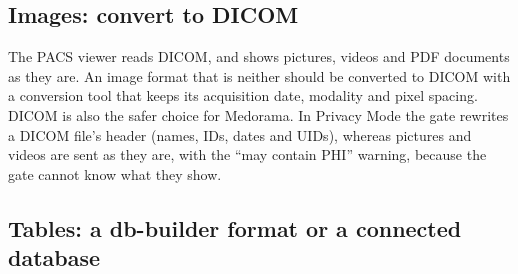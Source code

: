 \subsection{Images: convert to DICOM}
\label{sec:readers-images}

The PACS viewer reads DICOM, and shows pictures, videos and PDF documents as they are. An image
format that is neither should be converted to DICOM with a conversion tool that keeps its
acquisition date, modality and pixel spacing. DICOM is also the safer choice for Medorama. In
Privacy Mode the gate rewrites a DICOM file's header (names, IDs, dates and UIDs), whereas
pictures and videos are sent as they are, with the ``may contain PHI'' warning, because the gate
cannot know what they show.

\subsection{Tables: a db-builder format or a connected database}
\label{sec:readers-tables}

